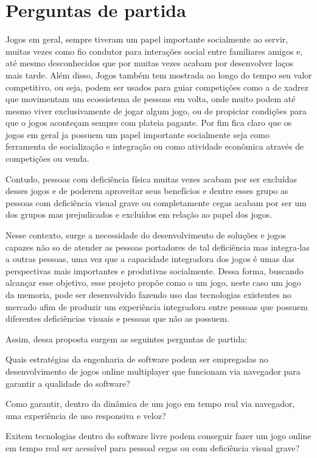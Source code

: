 \chapter{Perguntas de partida}

\label{chap:Perguntas de partida}


Jogos em geral, sempre tiveram um papel importante socialmente ao servir, muitas vezes como  fio condutor para interações social entre familiares amigos e, até mesmo desconhecidos que por muitas vezes acabam por desenvolver laços mais tarde. Além disso, Jogos também tem mostrada ao longo do tempo seu valor competitivo, ou seja, podem ser usados para guiar competições como a de xadrez que movimentam um ecossistema de pessoas em volta, onde muito podem até mesmo viver exclusivamente de jogar algum jogo, ou de propiciar condições para que o jogos aconteçam sempre com plateia pagante. Por fim fica claro que os jogos em geral ja possuem um papel importante socialmente seja como ferramenta de socialização e integração ou como atividade econômica através de competições ou venda.


Contudo, pessoas com deficiência física muitas vezes acabam por ser excluídas desses jogos e de poderem aproveitar seus benefícios e dentre esses grupo as pessoas com deficiência visual grave ou completamente cegas acabam por ser um dos grupos mas prejudicados e excluídos em relação ao papel dos jogos.

Nesse contexto, surge a necessidade do desenvolvimento de soluções e jogos capazes não so de atender as pessoas portadores de tal deficiência mas integra-las a outras pessoas, uma vez que a capacidade integradora dos jogos é umas das perspectivas mais importantes e produtivas socialmente. Dessa forma, buscando alcançar esse objetivo, esse projeto propõe como o um jogo, neste caso um jogo da memoria, pode ser desenvolvido fazendo uso das tecnologias existentes no mercado afim de produzir um experiência integradora entre pessoas que possuem diferentes deficiências visuais e pessoas que não as possuem. 

Assim, dessa proposta surgem as seguintes perguntas de partida:

\begin{questao}
  \item Quais estratégias da engenharia de software podem ser empregadas no desenvolvimento de jogos online multiplayer que funcionam via navegador para garantir a qualidade do software?
  \item Como garantir, dentro da dinâmica de um jogo em tempo real via navegador, uma experiência de uso responsiva e veloz?
  \item Exitem tecnologias dentro do software livre podem conseguir fazer um jogo online em tempo real ser acessível para pessoal cegas ou com deficiência visual grave?
\end{questao}
